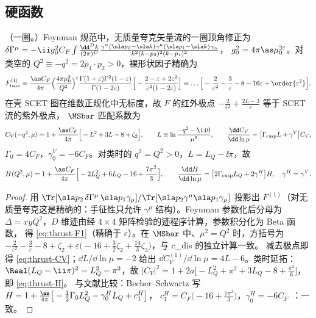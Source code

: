 \subsection{硬函数}

\begin{proposition}[两喷注流的一圈匹配]\tagR\label{prop:hard-matching}
（一圈。）Feynman 规范中，无质量夸克矢量流的一圈顶角修正为
$\delta\Gamma^\mu=-\ii g_0^2C_F\int\frac{\dd^Dk}{(2\pi)^D}\frac{\gamma^\alpha(\sla p_2-\sla k)\gamma^\mu(\sla p_1-\sla k)\gamma_\alpha}{k^2(k-p_2)^2(k-p_1)^2}$，
$g_0^2=4\pi\as\mu_0^{2\varepsilon}$。对类空的 $Q^2\equiv-q^2=2p_1\cdot p_2>0$，裸形状因子精确为
\begin{equation}\label{eq:thrust-F1}
F^{(1)}_{\rm bare}=\frac{\as C_F}{4\pi}\Big(\frac{4\pi\mu_0^2}{Q^2}\Big)^{\varepsilon}
\frac{\Gamma(1+\varepsilon)\Gamma^2(1-\varepsilon)}{\Gamma(1-2\varepsilon)}
\Big[-\frac{2-\varepsilon+2\varepsilon^2}{\varepsilon^2(1-2\varepsilon)}\Big]
=\dots\Big[-\frac{2}{\varepsilon^2}-\frac{3}{\varepsilon}-8-16\varepsilon+\order{\varepsilon^2}\Big].
\end{equation}
在壳 SCET 图在维数正规化中无标度，故 $F$ 的红外极点 $-\frac{2}{\varepsilon^2}+\frac{2L-3}{\varepsilon}$ 等于 SCET 流的紫外极点，
$\MSbar$ 匹配系数为
\begin{equation}\label{eq:thrust-CV}
C_V(-q^2,\mu)=1+\frac{\as C_F}{4\pi}\Big[-L^2+3L-8+\zeta_2\Big],\qquad L\equiv\ln\frac{-q^2-\ii0}{\mu^2},
\qquad \frac{\dd C_V}{\dd\ln\mu}=\big[\Gamma_{\rm cusp}L+\gamma^V\big]C_V,
\end{equation}
$\Gamma_0=4C_F$，$\gamma^V_0=-6C_F$。对类时的 $q^2=Q^2>0$，$L=L_Q-\ii\pi$，故
\begin{equation}\label{eq:thrust-H}
H(Q^2,\mu)=1+\frac{\as C_F}{4\pi}\Big[-2L_Q^2+6L_Q-16+\frac{7\pi^2}{3}\Big],\qquad
\frac{\dd H}{\dd\ln\mu}=\big[2\Gamma_{\rm cusp}L_Q+2\gamma^H\big]H,\quad \gamma^H=\gamma^V .
\end{equation}
\end{proposition}

\begin{proof}
用 $\Tr[\sla p_2\,\delta\Gamma^\mu\,\sla p_1\gamma_\mu]/\Tr[\sla p_2\gamma^\mu\sla p_1\gamma_\mu]$ 投影出 $F^{(1)}$（对无质量夸克这是精确的：手征性只允许
$\gamma^\mu$ 结构）。Feynman 参数化后分母为 $\Delta=xyQ^2$，$D$ 维迹由经 $4\times4$ 矩阵检验的迹程序计算，参数积分化为 Beta 函数，
得 \cref{eq:thrust-F1}（精确于 $\varepsilon$）。在 $\MSbar$ 中、$\mu^2=Q^2$ 时，方括号为
$-\frac2{\varepsilon^2}-\frac3\varepsilon-8+\zeta_2+\varepsilon\big(-16+\frac32\zeta_2+\frac{14}{3}\zeta_3\big)$，与 c\_dis 的独立计算一致。
减去极点即得 \cref{eq:thrust-CV}；$\dd L/\dd\ln\mu=-2$ 给出 $\dd C_V^{(1)}/\dd\ln\mu=4L-6$。类时延拓：
$\Real(L_Q-\ii\pi)^2=L_Q^2-\pi^2$，故 $|C_V|^2=1+2a\big[-L_Q^2+\pi^2+3L_Q-8+\frac{\pi^2}{6}\big]$，即 \cref{eq:thrust-H}。
与文献比较：Becher--Schwartz 写 $H=1+\frac{\as}{4\pi}\big[-\frac12\Gamma_0L_Q^2-\gamma^H_0L_Q+c^H_1\big]$，
$c_1^H=C_F\big(-16+\frac{7\pi^2}{3}\big)$，$\gamma^H_0=-6C_F$~\cite{BecherSchwartz2008}：一致。
\end{proof}

